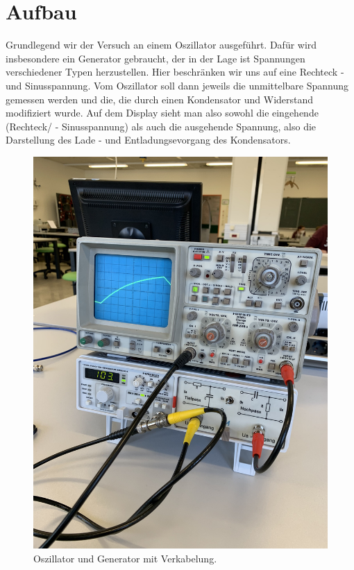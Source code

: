 \section{Aufbau}

\begin{minipage}{0.6\textwidth}
Grundlegend wir der Versuch an einem Oszillator ausgeführt.
Dafür wird insbesondere ein Generator gebraucht, der in der Lage ist Spannungen verschiedener 
Typen herzustellen. Hier beschränken wir uns auf eine Rechteck - und Sinusspannung. 
Vom Oszillator soll dann jeweils die unmittelbare Spannung gemessen werden und die, 
die durch einen Kondensator und Widerstand modifiziert wurde.
Auf dem Display sieht man also sowohl die eingehende (Rechteck/ - Sinusspannung) als 
auch die ausgehende Spannung, also die Darstellung des Lade - und Entladungsevorgang des Kondensators.
\end{minipage}
\begin{minipage}[c]{0.3\textwidth}
     \begin{figure}[H]
        \centering
        \includegraphics[width=\textwidth]{bilder/oszillator.png}
        \caption{Oszillator und Generator mit Verkabelung.}
        \label{fig:aufbau}
        \end{figure}     
\end{minipage}
 
